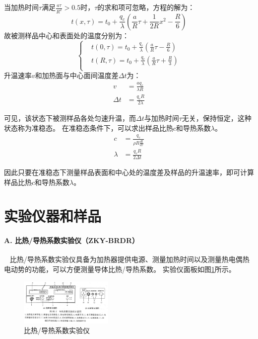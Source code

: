 \documentclass[10pt,a4paper,twocolumn,twoside,UTF8]{ctexart}
\begin{document}
当加热时间$\tau$满足$\frac{a\tau}{R^2}>0.5$时，$\tau$的求和项可忽略，方程的解为：
\begin{equation}
	t(x,\tau)=t_0+\frac{q_c}{\lambda}\left(\frac{a}{R}\tau+\frac{1}{2R}x^2-\frac{R}{6}\right)
	\label{eq:1.2}
\end{equation}
故被测样品中心和表面处的温度分别为：
\begin{equation}
	\left\{
	\begin{aligned}
	&t(0,\tau)=t_0+\frac{q_c}{\lambda}\left(\frac{a}{R}\tau-\frac{R}{6}\right)\\
	&t(R,\tau)=t_0+\frac{q_c}{\lambda}\left(\frac{a}{R}\tau+\frac{R}{3}\right)\\
	\end{aligned}
	\right.
	\label{eq:1.3}
\end{equation}
升温速率$v$和加热面与中心面间温度差$\Delta t$为：
\begin{align}
	v &= \frac{a q_c}{\lambda R}  \\
	\Delta t &= \frac{q_cR}{2\lambda} \label{eq:1.4}
\end{align}

可见，该状态下被测样品各处匀速升温，而$\Delta t$与加热时间$\tau$无关，保持恒定，这种状态称为准稳态。
在准稳态条件下，可以求出样品比热$c$和导热系数$\lambda$。
\begin{align}
	c &=\frac{q_c}{\rho R \frac{dt}{d\tau}} \label{eq:1.5.1} \\
	\lambda &= \frac{q_c R}{2\varDelta t} \label{eq:1.5.2}
\end{align}

因此只要在准稳态下测量样品表面和中心处的温度差及样品的升温速率，即可计算样品比热$c$和导热系数$\lambda$。

\section{实验仪器和样品}
	\paragraph{A. 比热/导热系数实验仪（ZKY-BRDR）}~
	\newline 
	\indent
	比热/导热系数实验仪具备为加热器提供电源、测量加热时间以及测量热电偶热电动势的功能，可以方便测量导体比热/导热系数。
	实验仪面板如图\ref{fig:illus-2}所示。
	\begin{figure}[htbp]
        \centering
        \includegraphics[width=0.4\textwidth]{attachments/illus-2.png}
        \caption{比热/导热系数实验仪}
        \label{fig:illus-2}
    \end{figure}
	
\end{document}
